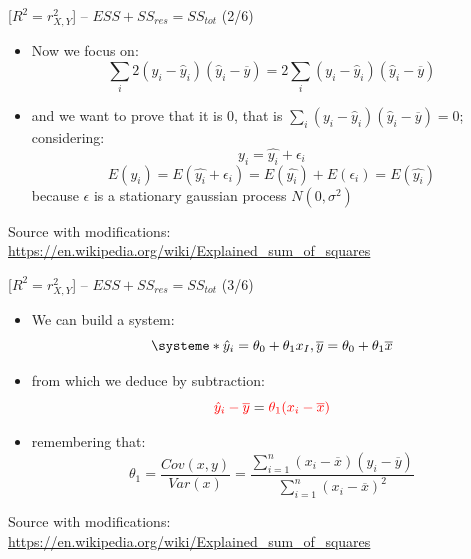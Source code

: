 \documentclass{beamer}
\begin{document}
\begin{frame}
{\centerline{ [$R^2 = r_{X,Y}^2$] -- $ESS + SS_{res} = SS_{tot} $ (2/6)}}

\begin{itemize}
\item Now we focus on:
$$\sum_i2(y_{i}-{\hat {y}}_{i})({\hat {y}}_{i}-{\overline {y}}) = 2\sum_i(y_{i}-{\hat {y}}_{i})({\hat {y}}_{i}-{\overline {y}}) $$
\item and we want to prove that it is 0, that is $\sum_i(y_{i}-{\hat {y}}_{i})({\hat {y}}_{i}-{\overline {y}}) = 0$;  considering:
$$y_i = \hat{y_i} + \epsilon_i$$
$$ E(y_i) = E(\hat{y_i} + \epsilon_i) = E(\hat{y_i}) + E(\epsilon_i) = E(\hat{y_i}) $$
because $\epsilon$ is a stationary gaussian process $N(0,\sigma^2)$

\end{itemize}

\begin{center}
\tiny 
Source with modifications: \url{https://en.wikipedia.org/wiki/Explained_sum_of_squares}
\end{center}

\end{frame}

\begin{frame}
{\centerline{ [$R^2 = r_{X,Y}^2$] -- $ESS + SS_{res} = SS_{tot} $ (3/6)}}

\begin{itemize}
\item We can build a system:
\[
\systeme*{
\hat{y}_i = \theta_0 + \theta_{1} x_{I},
\overline{y} = \theta_0 + \theta_1 \overline{x}
}
\]
\item from which we deduce by subtraction:
$$\textcolor{red}{\hat{y}_i - \overline{y}} = \textcolor{red}{\theta_1 (x_i - \overline{x})}$$
\item remembering that:
$$ \theta_1  = \frac { Cov(x,y)} { Var(x) } = {\frac {\sum _{i=1}^{n}(x_{i}-{\overline {x}})(y_{i}-{\overline {y}})}{\sum _{i=1}^{n}(x_{i}-{\overline {x}})^{2}}}$$
\end{itemize}

\begin{center}
\tiny
Source with modifications: \url{https://en.wikipedia.org/wiki/Explained_sum_of_squares}
\end{center}

\end{frame}
\end{document}
